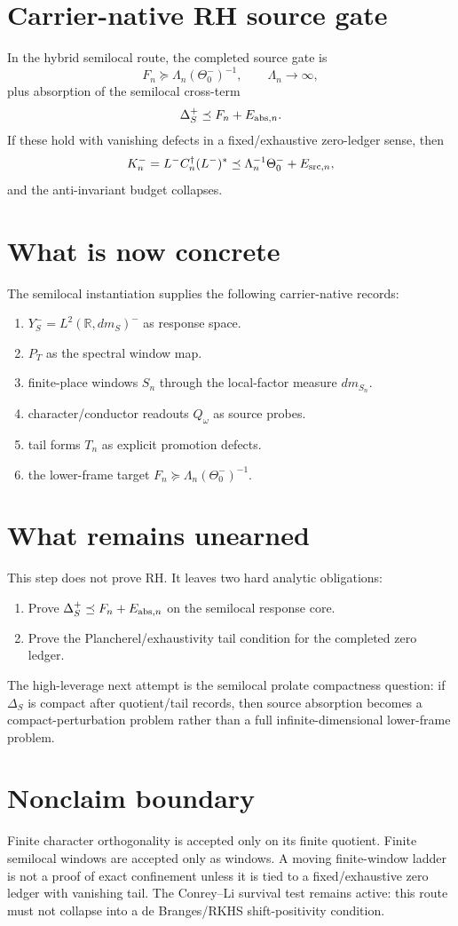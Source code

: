 \documentclass[11pt]{article}
\newcommand{\R}{\mathbb R}
\begin{document}
\section{Carrier-native RH source gate}
In the hybrid semilocal route, the completed source gate is
\[
F_n\succeq \Lambda_n(\Theta_0^-)^{-1},
\qquad \Lambda_n\to\infty,
\]
plus absorption of the semilocal cross-term
\[
\Delta_S^+\preceq F_n+E_{{\rm abs},n}.
\]
If these hold with vanishing defects in a fixed/exhaustive zero-ledger sense, then
\[
K_n^-=L^-C_n^\dagger(L^-)^*\preceq \Lambda_n^{-1}\Theta_0^-+E_{{\rm src},n},
\]
and the anti-invariant budget collapses.

\section{What is now concrete}
The semilocal instantiation supplies the following carrier-native records:
\begin{enumerate}[label=(\roman*)]
\item \(Y_S^-=L^2(\R,dm_S)^-\) as response space.
\item \(P_T\) as the spectral window map.
\item finite-place windows \(S_n\) through the local-factor measure \(dm_{S_n}\).
\item character/conductor readouts \(Q_\omega\) as source probes.
\item tail forms \(T_n\) as explicit promotion defects.
\item the lower-frame target \(F_n\succeq\Lambda_n(\Theta_0^-)^{-1}\).
\end{enumerate}

\section{What remains unearned}
This step does not prove RH. It leaves two hard analytic obligations:
\begin{enumerate}[label=(\alph*)]
\item Prove \(\Delta_S^+\preceq F_n+E_{{\rm abs},n}\) on the semilocal response core.
\item Prove the Plancherel/exhaustivity tail condition for the completed zero ledger.
\end{enumerate}
The high-leverage next attempt is the semilocal prolate compactness question: if \(\Delta_S\) is compact after quotient/tail records, then source absorption becomes a compact-perturbation problem rather than a full infinite-dimensional lower-frame problem.

\section{Nonclaim boundary}
Finite character orthogonality is accepted only on its finite quotient. Finite semilocal windows are accepted only as windows. A moving finite-window ladder is not a proof of exact confinement unless it is tied to a fixed/exhaustive zero ledger with vanishing tail. The Conrey--Li survival test remains active: this route must not collapse into a de Branges/RKHS shift-positivity condition.
\end{document}
